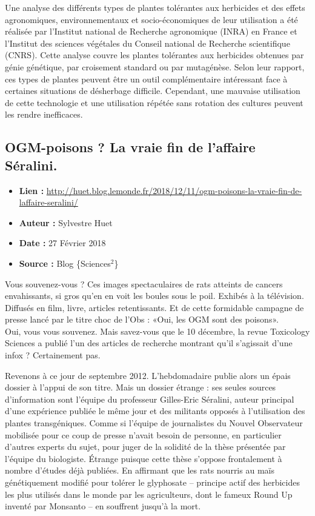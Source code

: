 \documentclass[8pt]{article}
\begin{document}
Une analyse des différents types de plantes tolérantes aux herbicides et des effets agronomiques, environnementaux et socio-économiques de leur utilisation a été réalisée par l’Institut national de Recherche agronomique (INRA) en France et l’Institut des sciences végétales du Conseil national de Recherche scientifique (CNRS). Cette analyse couvre les plantes tolérantes aux herbicides obtenues par génie génétique, par croisement standard ou par mutagénèse. Selon leur rapport, ces types de plantes peuvent être un outil complémentaire intéressant face à certaines situations de désherbage difficile. Cependant, une mauvaise utilisation de cette technologie et une utilisation répétée sans rotation des cultures peuvent les rendre inefficaces.

\newpage
\subsection{OGM-poisons ? La vraie fin de l’affaire Séralini.}
\label{sec:sante}

\begin{itemize}
	\item \textbf{Lien : }  \url{http://huet.blog.lemonde.fr/2018/12/11/ogm-poisons-la-vraie-fin-de-laffaire-seralini/} 
	\item \textbf{Auteur : } Sylvestre Huet
	\item \textbf{Date : }  27 Février 2018 
	\item \textbf{Source : } Blog \{Sciences$^2$\}
\end{itemize}

Vous souvenez-vous ? Ces images spectaculaires de rats atteints de cancers envahissants, si gros qu’en en voit les boules sous le poil. Exhibés à la télévision. Diffusés en film, livre, articles retentissants. Et de cette formidable campagne de presse lancé par le titre choc de l’Obs : «Oui, les OGM sont des poisons». \\

Oui, vous vous souvenez. Mais savez-vous que le 10 décembre, la revue Toxicology Sciences a publié l’un des articles de recherche montrant qu’il s’agissait d’une infox ? Certainement pas.

Revenons à ce jour de septembre 2012. L’hebdomadaire publie alors un épais dossier à l’appui de son titre. Mais un dossier étrange : ses seules sources d’information sont l’équipe du professeur Gilles-Eric Séralini, auteur principal d’une expérience publiée le même jour et des militants opposés à l’utilisation des plantes transgéniques. Comme si l’équipe de journalistes du Nouvel Observateur mobilisée pour ce coup de presse n’avait besoin de personne, en particulier d’autres experts du sujet, pour juger de la solidité de la thèse présentée par l’équipe du biologiste. Étrange puisque cette thèse s’oppose frontalement à nombre d’études déjà publiées. En affirmant que les rats nourris au maïs génétiquement modifié pour tolérer le glyphosate – principe actif des herbicides les plus utilisés dans le monde par les agriculteurs, dont le fameux Round Up inventé par Monsanto – en souffrent jusqu’à la mort.
\end{document}
